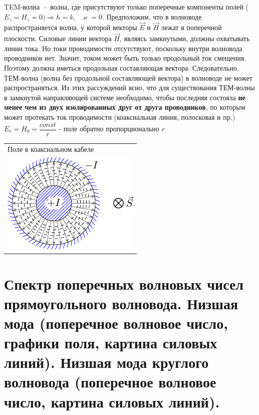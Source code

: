 \begin{multicols*}{2}
		TEM-волна~--~волна, где присутствуют только поперечные компоненты полей ($E_z = H_z = 0) \Rightarrow h = k$,~ $\varkappa = 0$. Предположим, что в волноводе распространяется волна, у которой векторы $\vec{E}$ и $\vec{H}$ лежат в поперечной плоскости. Силовые линии вектора $\vec{H}$, являясь замкнутыми, должны охватывать линии тока. Но токи проводимости отсутствуют, поскольку внутри волновода проводников нет. Значит, током может быть только продольный ток смещения. Поэтому должна иметься продольная составляющая вектора. Следовательно, ТЕМ-волна (волна без продольной составляющей вектора) в волноводе не может распространяться. Из этих рассуждений ясно, что для существования ТЕМ-волны в замкнутой направляющей системе необходимо, чтобы последняя состояла \textbf{не менее чем из двух изолированных друг от друга проводников}, по которым может протекать ток проводимости (коаксиальная линия, полосковая и пр.)\\
		$E_r = H_\theta = \dfrac{const}{r}$ - поле обратно пропорционально $r$\\
		\begin{tabular}{l}
			{Поле в коаксиальном кабеле} \\
			\includegraphics[width=0.25\linewidth]{aed_imgs/lect4_ris6} \\
		\end{tabular}
		
		\section{Спектр поперечных волновых чисел прямоугольного волновода. Низшая мода (поперечное волновое число, графики поля, картина силовых линий). Низшая мода круглого волновода (поперечное волновое число, картина силовых линий).}
		

\end{multicols*}
